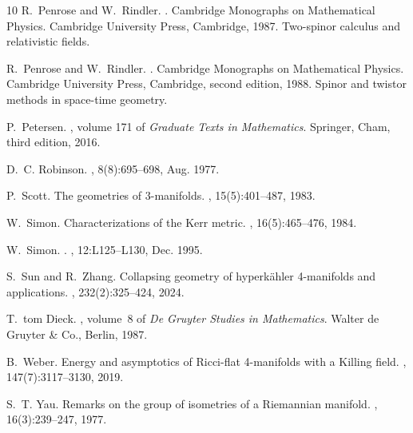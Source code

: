 \documentclass[a4paper,10pt,reqno]{amsart}
\theoremstyle{plain}
\numberwithin{equation}{section}
\begin{document}
\begin{thebibliography}{10}
R.~Penrose and W.~Rindler.
.
\newblock Cambridge Monographs on Mathematical Physics. Cambridge University
  Press, Cambridge, 1987.
\newblock Two-spinor calculus and relativistic fields.

R.~Penrose and W.~Rindler.
.
\newblock Cambridge Monographs on Mathematical Physics. Cambridge University
  Press, Cambridge, second edition, 1988.
\newblock Spinor and twistor methods in space-time geometry.

P.~Petersen.
, volume 171 of {\em Graduate Texts in
  Mathematics}.
\newblock Springer, Cham, third edition, 2016.

D.~C. {Robinson}.
, 8(8):695--698, Aug. 1977.

P.~Scott.
\newblock The geometries of {$3$}-manifolds.
, 15(5):401--487, 1983.

W.~Simon.
\newblock Characterizations of the {K}err metric.
, 16(5):465--476, 1984.

W.~{Simon}.
.
, 12:L125--L130, Dec. 1995.

S.~Sun and R.~Zhang.
\newblock Collapsing geometry of hyperk{\"a}hler 4-manifolds and applications.
, 232(2):325--424, 2024.

T.~tom Dieck.
, volume~8 of {\em De Gruyter Studies in
  Mathematics}.
\newblock Walter de Gruyter \& Co., Berlin, 1987.

B.~Weber.
\newblock Energy and asymptotics of {R}icci-flat 4-manifolds with a {K}illing
  field.
, 147(7):3117--3130, 2019.

S.~T. Yau.
\newblock Remarks on the group of isometries of a {R}iemannian manifold.
, 16(3):239--247, 1977.

\end{thebibliography}
\end{document}
